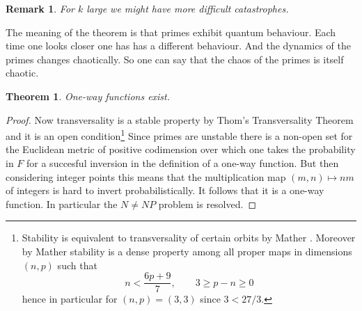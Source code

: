 \documentclass[10pt,a4paper]{amsart}
\newtheorem{theorem}{Theorem}
\newtheorem{remark}{Remark}
\begin{document}
\begin{remark}
    For $k$ large we might have more difficult catastrophes.
\end{remark}

The meaning of the theorem is that primes exhibit quantum behaviour. Each time one looks closer one has has a different behaviour. And the dynamics of the primes changes chaotically. So one can say that the chaos of the primes is itself chaotic.
\begin{theorem}
One-way functions exist.
\end{theorem}
\begin{proof}
Now transversality is a stable property by Thom's Transversality Theorem \cite{Kosinski} and it is an open condition\footnote{Stability is equivalent to transversality of certain orbits by Mather \cite[Theorem 4.1]{Mather}. Moreover by Mather \cite{Mather} stability is a dense property among all proper maps in dimensions $(n, p)$ such that 
$$n<\frac{6p+9}{7},\qquad 3\geq p-n\geq 0$$
hence in particular for $(n, p)=(3, 3)$ since $3<27/3$.}
Since primes are unstable there is a non-open set for the Euclidean metric of positive codimension over which one takes the probability in $F$ for a succesful inversion in the definition of a one-way function. But then considering integer points this means that the multiplication map $(m, n)\mapsto nm$ of integers is hard to invert probabilistically. It follows that it is a one-way function. In particular the $N\neq NP$ problem is resolved.
\end{proof}
\end{document}
